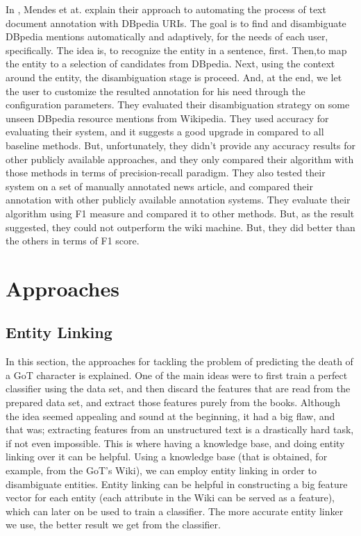 \documentclass[letterpaper]{article}
\begin{document}
In \cite{dbpedia}, Mendes et at. explain their approach to automating the process of text document annotation with DBpedia URIs. The goal is to find and disambiguate DBpedia mentions automatically and adaptively, for the needs of each user, specifically. The idea is, to recognize the entity in a sentence, first. Then,to map the entity to a selection of candidates from DBpedia. Next, using the context around the entity, the disambiguation stage is proceed. And, at the end, we let the user to customize the resulted annotation for his need through the configuration parameters. They evaluated their disambiguation strategy on some unseen DBpedia resource mentions from Wikipedia. They used accuracy for evaluating their system, and it suggests a good upgrade in compared to all baseline methods. But, unfortunately, they didn't provide any accuracy results for other publicly available approaches, and they only compared their algorithm with those methods in terms of precision-recall paradigm. They also tested their system on a set of manually annotated news article, and compared their annotation with other publicly available annotation systems. They evaluate their algorithm using F1 measure and compared it to other methods. But, as the result suggested, they could not outperform the wiki machine. But, they did better than the others in terms of F1 score.


\section{Approaches} \label{sec:approach}

\subsection{Entity Linking}

In this section, the approaches for tackling the problem of predicting the death of a GoT character is explained. One of the main ideas were to first train a perfect classifier using the data set, and then discard the features that are read from the prepared data set, and extract those features purely from the books. Although the idea seemed appealing and sound at the beginning, it had a big flaw, and that was; extracting features from an unstructured text is a drastically hard task, if not even impossible. This is where having a knowledge base, and doing entity linking over it can be helpful. Using a knowledge base (that is obtained, for example, from the GoT's Wiki), we can employ entity linking in order to disambiguate entities. Entity linking can be helpful in constructing a big feature vector for each entity (each attribute in the Wiki can be served as a feature), which can later on be used to train a classifier. The more accurate entity linker we use, the better result we get from the classifier.
\end{document}
